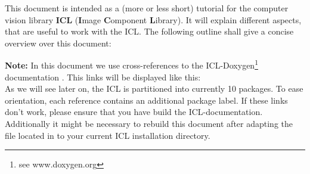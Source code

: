%
%

This document is intended as a (more or less short) tutorial for the computer vision library \textbf{ICL} (\textbf{I}mage \textbf{C}omponent \textbf{L}ibrary). It will explain different aspects, that are useful to work with the ICL. The following outline shall give a concise overview over this document:

\textbf{Note:} In this document we use cross-references to the ICL-Doxygen\footnote{see www.doxygen.org} documentation \iclrefref. This links will be displayed like this:
\\
As we will see later on, the ICL is partitioned into currently 10 packages. To ease orientation, each reference contains an additional package label. If these links don't work, please ensure that you have build the ICL-documentation. Additionally it might be necessary to rebuild this document after adapting the  file located in  to your current ICL installation directory.

